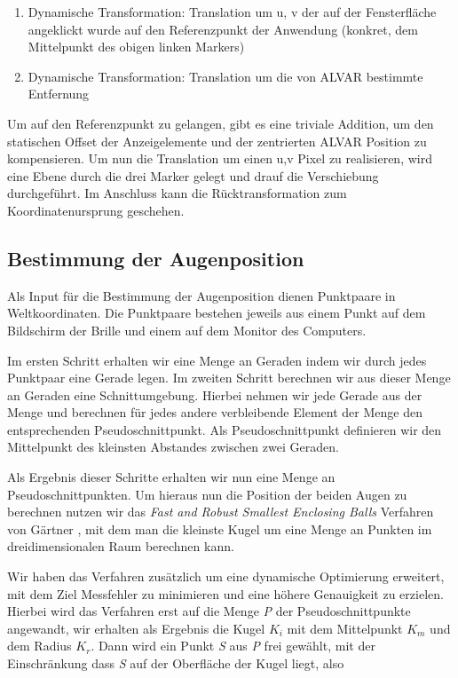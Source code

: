    \begin{enumerate}
      \item Dynamische Transformation:  Translation  um u, v der auf der Fensterfläche angeklickt wurde auf den Referenzpunkt der Anwendung (konkret, dem Mittelpunkt des obigen linken Markers) 
      \item Dynamische Transformation: Translation um die von ALVAR bestimmte Entfernung
   \end{enumerate}

Um auf den Referenzpunkt zu gelangen, gibt es eine triviale Addition, um den statischen Offset der Anzeigelemente und der zentrierten ALVAR Position zu kompensieren. 
Um nun die Translation um einen u,v Pixel zu realisieren, wird eine Ebene durch die drei Marker gelegt und drauf die Verschiebung durchgeführt. 
Im Anschluss kann die Rücktransformation zum Koordinatenursprung geschehen.


\subsection{Bestimmung der Augenposition}
\label{sec:Augenposition}
Als Input für die Bestimmung der Augenposition dienen Punktpaare in Weltkoordinaten. Die Punktpaare bestehen jeweils aus einem Punkt auf dem Bildschirm der Brille und einem auf dem Monitor des Computers.

Im ersten Schritt erhalten wir eine Menge an Geraden indem wir durch jedes Punktpaar eine Gerade legen. Im zweiten Schritt berechnen wir aus dieser Menge an Geraden eine Schnittumgebung. Hierbei nehmen wir jede Gerade aus der Menge und berechnen für jedes andere verbleibende Element der Menge den entsprechenden Pseudoschnittpunkt. Als Pseudoschnittpunkt definieren wir den      Mittelpunkt des kleinsten Abstandes zwischen zwei Geraden.

Als Ergebnis dieser Schritte erhalten wir nun eine Menge an Pseudoschnittpunkten. Um hieraus nun die Position der beiden Augen zu berechnen nutzen wir das \emph{Fast and Robust Smallest Enclosing Balls} Verfahren von Gärtner \cite{gaertner}, mit dem man die kleinste Kugel um eine Menge an Punkten im dreidimensionalen Raum berechnen kann.

Wir haben das Verfahren zusätzlich um eine dynamische Optimierung erweitert, mit dem Ziel
Messfehler zu minimieren und eine höhere Genauigkeit zu erzielen.\\ 

Hierbei wird das Verfahren erst auf die Menge \emph{P} der Pseudoschnittpunkte angewandt, wir erhalten als Ergebnis die Kugel $K_i$ mit  dem Mittelpunkt $K_m$ und dem Radius $K_r$. Dann wird ein Punkt \emph{S} aus \emph{P} frei gewählt, mit der Einschränkung dass \emph{S} auf der Oberfläche der Kugel liegt, also

